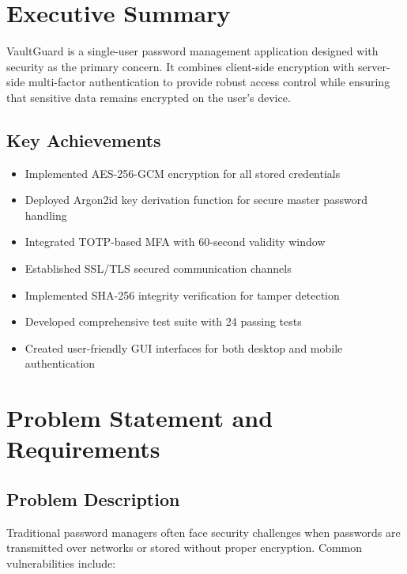 \documentclass[12pt,a4paper]{report}
\begin{document}
\tableofcontents
\newpage

\chapter{Executive Summary}

VaultGuard is a single-user password management application designed with security as the primary concern. It combines client-side encryption with server-side multi-factor authentication to provide robust access control while ensuring that sensitive data remains encrypted on the user's device.

\section{Key Achievements}

\begin{itemize}
    \item Implemented AES-256-GCM encryption for all stored credentials
    \item Deployed Argon2id key derivation function for secure master password handling
    \item Integrated TOTP-based MFA with 60-second validity window
    \item Established SSL/TLS secured communication channels
    \item Implemented SHA-256 integrity verification for tamper detection
    \item Developed comprehensive test suite with 24 passing tests
    \item Created user-friendly GUI interfaces for both desktop and mobile authentication
\end{itemize}

\chapter{Problem Statement and Requirements}

\section{Problem Description}

Traditional password managers often face security challenges when passwords are transmitted over networks or stored without proper encryption. Common vulnerabilities include:
\end{document}
